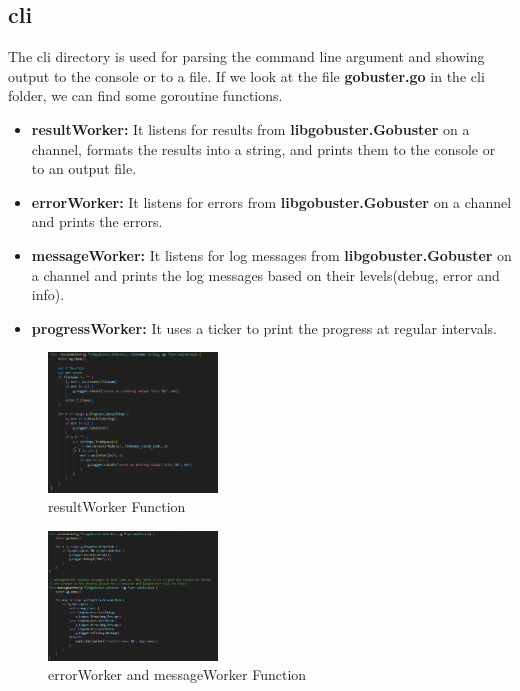 \documentclass[12 pt]{article}
\begin{document}
\subsection{cli}
The cli directory is used for parsing the command line argument and showing output to the console or to a file. If we look at the file \textbf{gobuster.go} in the cli folder, we can find some goroutine functions.
\begin{itemize}
    \item \textbf{resultWorker:} It listens for results from \textbf{libgobuster.Gobuster} on a channel, formats the results into a string, and prints them to the console or to an output file.
    \item \textbf{errorWorker:} It listens for errors from \textbf{libgobuster.Gobuster} on a channel and prints the errors.
    \item \textbf{messageWorker:} It listens for log messages from \textbf{libgobuster.Gobuster} on a channel and prints the log messages based on their levels(debug, error and info).
    \item \textbf{progressWorker:} It uses a ticker to print the progress at regular intervals.
\end{itemize}  
\begin{figure}[H]
    \centering
    \includegraphics[width=0.4\textwidth]{resultWorker.png}
    \caption{resultWorker Function}
    \label{fig: resultWorker}
\end{figure}
\begin{figure}[H]
    \centering
    \includegraphics[width=0.4\textwidth]{errorWorker_messageWorker.png}
    \caption{errorWorker and messageWorker Function}
    \label{fig: errorWorker and messageWorker}
\end{figure}
\end{document}
